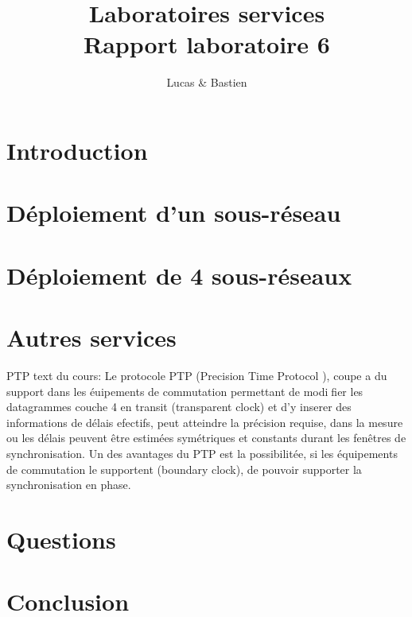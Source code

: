 \documentclass{article}
\title{%
	Laboratoires services \\
	\large Rapport laboratoire 6
}
\author{\bsc{Bulloni} Lucas \& \bsc{Wermeille} Bastien}
\begin{document}
\maketitle

\newpage

\tableofcontents

\newpage

\section{Introduction}

\section{Déploiement d'un sous-réseau}

\section{Déploiement de 4 sous-réseaux}

\section{Autres services}

PTP text du cours:
Le protocole PTP (Precision Time Protocol ), coupe a du support dans les éuipements de commutation permettant de modifier les datagrammes couche 4 en transit (transparent clock) et d'y inserer des informations de délais efectifs, peut atteindre la précision requise, dans la mesure ou les délais peuvent être estimées symétriques et constants durant les fenêtres de synchronisation. Un des avantages du
PTP est la possibilitée, si les équipements de commutation le supportent (boundary clock), de pouvoir supporter la synchronisation en phase.

\section{Questions}

\section{Conclusion}

\printbibliography
\end{document}
